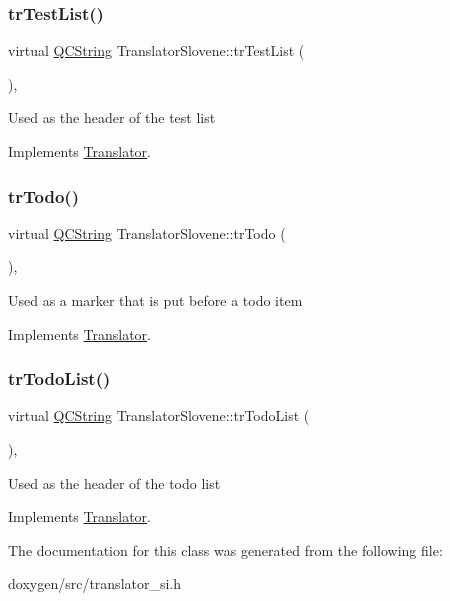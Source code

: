 \subsubsection{\texorpdfstring{trTestList()}{trTestList()}}
{\footnotesize\ttfamily virtual \mbox{\hyperlink{class_q_c_string}{Q\+C\+String}} Translator\+Slovene\+::tr\+Test\+List (\begin{DoxyParamCaption}{ }\end{DoxyParamCaption})\hspace{0.3cm}{\ttfamily [inline]}, {\ttfamily [virtual]}}

Used as the header of the test list 

Implements \mbox{\hyperlink{class_translator}{Translator}}.

\mbox{\label{class_translator_slovene_af09cac9689015788da10a4a4bb057dd8}} 
\subsubsection{\texorpdfstring{trTodo()}{trTodo()}}
{\footnotesize\ttfamily virtual \mbox{\hyperlink{class_q_c_string}{Q\+C\+String}} Translator\+Slovene\+::tr\+Todo (\begin{DoxyParamCaption}{ }\end{DoxyParamCaption})\hspace{0.3cm}{\ttfamily [inline]}, {\ttfamily [virtual]}}

Used as a marker that is put before a todo item 

Implements \mbox{\hyperlink{class_translator}{Translator}}.

\mbox{\label{class_translator_slovene_aa8632d90b7d93aa7859d1215fc5678ad}} 
\subsubsection{\texorpdfstring{trTodoList()}{trTodoList()}}
{\footnotesize\ttfamily virtual \mbox{\hyperlink{class_q_c_string}{Q\+C\+String}} Translator\+Slovene\+::tr\+Todo\+List (\begin{DoxyParamCaption}{ }\end{DoxyParamCaption})\hspace{0.3cm}{\ttfamily [inline]}, {\ttfamily [virtual]}}

Used as the header of the todo list 

Implements \mbox{\hyperlink{class_translator}{Translator}}.



The documentation for this class was generated from the following file\+:\begin{DoxyCompactItemize}
\item 
doxygen/src/translator\+\_\+si.\+h\end{DoxyCompactItemize}
